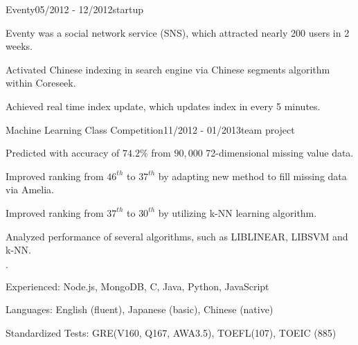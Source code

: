 \documentclass{joel_cv}
\begin{document}
\begin{sectionContentNormal}{Eventy}{05/2012 - 12/2012}{startup}
  \item Eventy was a social network service (SNS), which attracted nearly 200 users in 2 weeks.
  \item Activated Chinese indexing in search engine via Chinese segments algorithm within Coreseek.
  \item Achieved real time index update, which updates index in every 5 minutes.
\end{sectionContentNormal} 


\begin{sectionContentNormal}{Machine Learning Class Competition}{11/2012 - 01/2013}{team project}
  \item Predicted with accuracy of $74.2\%$ from $90,000$ 72-dimensional missing value data.
  \item Improved ranking from $46^{th}$ to $37^{th}$ by adapting new method to fill missing data via Amelia.
  \item Improved ranking from $37^{th}$ to $30^{th}$ by utilizing k-NN learning algorithm.
  \item Analyzed performance of several algorithms, such as LIBLINEAR, LIBSVM and k-NN.
\end{sectionContentNormal}

%
%

\begin{sectionItemize}{$\cdot$}
  \item Experienced: Node.js, MongoDB, C, Java, Python, JavaScript
  \item Languages: English (fluent), Japanese (basic), Chinese (native)
  \item Standardized Tests: GRE(V160, Q167, AWA3.5), TOEFL(107), TOEIC (885)
\end{sectionItemize}
\end{document}
